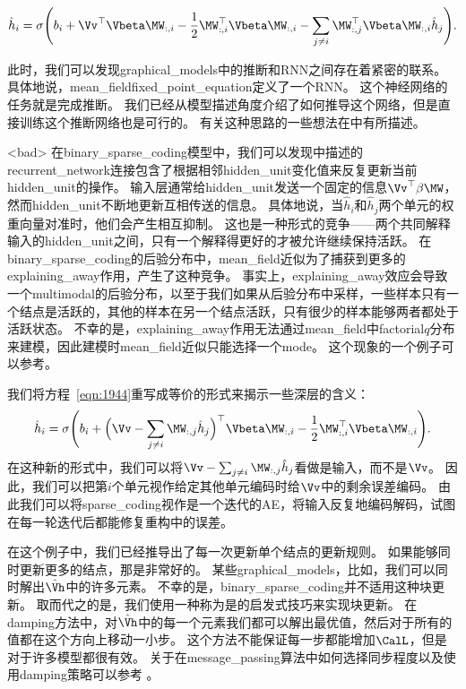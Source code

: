 \begin{align}
\label{eqn:1944}
\hat{h}_i = \sigma\Bigg(b_i + \Vv^{\top} {\Vbeta} \MW_{:,i} - \frac{1}{2} \MW_{:,i}^{\top} {\Vbeta} \MW_{:,i} - \sum_{j \neq i }  \MW_{:,j}^{\top} {\Vbeta}  \MW_{:,i} \hat{h}_j \Bigg).
\end{align}

此时，我们可以发现\gls{graphical_models}中的推断和\gls{RNN}之间存在着紧密的联系。
具体地说，\gls{mean_field}\gls{fixed_point_equation}定义了一个\gls{RNN}。
这个神经网络的任务就是完成推断。
我们已经从模型描述角度介绍了如何推导这个网络，但是直接训练这个推断网络也是可行的。
有关这种思路的一些想法在中有所描述。

<bad>
在\gls{binary_sparse_coding}模型中，我们可以发现中描述的\gls{recurrent_network}连接包含了根据相邻\gls{hidden_unit}变化值来反复更新当前\gls{hidden_unit}的操作。
输入层通常给\gls{hidden_unit}发送一个固定的信息$\Vv^{\top}\beta\MW$，然而\gls{hidden_unit}不断地更新互相传送的信息。
具体地说，当$\hat{h}_i$和$\hat{h}_j$两个单元的权重向量对准时，他们会产生相互抑制。
这也是一种形式的竞争——两个共同解释输入的\gls{hidden_unit}之间，只有一个解释得更好的才被允许继续保持活跃。
在\gls{binary_sparse_coding}的后验分布中，\gls{mean_field}近似为了捕获到更多的\gls{explaining_away}作用，产生了这种竞争。
事实上，\gls{explaining_away}效应会导致一个\gls{multimodal}的后验分布，以至于我们如果从后验分布中采样，一些样本只有一个结点是活跃的，其他的样本在另一个结点活跃，只有很少的样本能够两者都处于活跃状态。
不幸的是，\gls{explaining_away}作用无法通过\gls{mean_field}中\gls{factorial}$q$分布来建模，因此建模时\gls{mean_field}近似只能选择一个\gls{mode}。
这个现象的一个例子可以参考。




我们将方程~\eqref{eqn:1944}重写成等价的形式来揭示一些深层的含义：
\begin{align}
\hat{h}_i = \sigma\Bigg(b_i + \Big(\Vv - \sum_{j\neq i} \MW_{:,j}\hat{h}_j\Big)^{\top} {\Vbeta}\MW_{:,i} - \frac{1}{2} \MW_{:,i}^{\top} {\Vbeta} \MW_{:,i}\Bigg). 
\end{align}
在这种新的形式中，我们可以将$\Vv - \sum_{j\neq i} \MW_{:,j}\hat{h}_j$看做是输入，而不是$\Vv$。
因此，我们可以把第$i$个单元视作给定其他单元编码时给$\Vv$中的剩余误差编码。
由此我们可以将\gls{sparse_coding}视作是一个迭代的\gls{AE}，将输入反复地编码解码，试图在每一轮迭代后都能修复重构中的误差。


在这个例子中，我们已经推导出了每一次更新单个结点的更新规则。
如果能够同时更新更多的结点，那是非常好的。
某些\gls{graphical_models}，比如，我们可以同时解出$\hat{\Vh}$中的许多元素。
不幸的是，\gls{binary_sparse_coding}并不适用这种块更新。
取而代之的是，我们使用一种称为是的启发式技巧来实现块更新。
在\gls{damping}方法中，对$\hat{\Vh}$中的每一个元素我们都可以解出最优值，然后对于所有的值都在这个方向上移动一小步。
这个方法不能保证每一步都能增加$\CalL$，但是对于许多模型都很有效。
关于在\gls{message_passing}算法中如何选择同步程度以及使用\gls{damping}策略可以参考\citet{koller-book2009} 。




